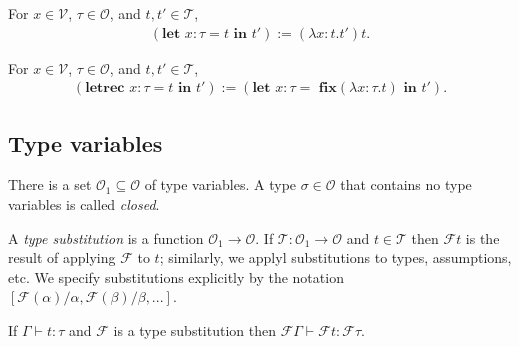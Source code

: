 \documentclass{article}
\begin{document}
\begin{definition*}[let]
	For $x\in\mathcal{V}$, $\tau\in\mathcal{O}$, and $t,t'\in\mathcal{T}$,
	\begin{align*}
		(\textbf{let $x:\tau = t$ in $t'$}) := (\lambda x:t.t')t.
	\end{align*}
\end{definition*}

\begin{definition*}[letrec]
	For $x\in\mathcal{V}$, $\tau\in\mathcal{O}$, and $t,t'\in\mathcal{T}$,
	\begin{align*}
		(\textbf{letrec $x:\tau=t$ in $t'$}) := (\textbf{let $x:\tau=$ fix$(\lambda x:\tau.t)$ in $t'$}).
	\end{align*}
\end{definition*}

\subsection{Type variables}

\begin{definition*}
	There is a set $\mathcal{O}_1\subseteq\mathcal{O}$ of type variables. A type $\sigma\in\mathcal{O}$
	that contains no type variables is called \emph{closed}.

	A \emph{type substitution} is a function $\mathcal{O}_1\to\mathcal{O}$. If
	$\mathcal{T}:\mathcal{O}_1\to\mathcal{O}$ and $t\in\mathcal{T}$ then $\mathcal{F} t$ is the result
	of applying $\mathcal{F}$ to $t$; similarly, we applyl substitutions to types, assumptions, etc.
	We specify substitutions explicitly by the notation $[\mathcal{F}(\alpha)/\alpha,
				\mathcal{F}(\beta)/\beta,...]$.
\end{definition*}

\begin{proposition*}[III.20]
	If $\Gamma\vdash t:\tau$ and $\mathcal{F}$ is a type substitution then $\mathcal{F}\Gamma \vdash \mathcal{F}t:\mathcal{F}\tau$.
\end{proposition*}
\end{document}
